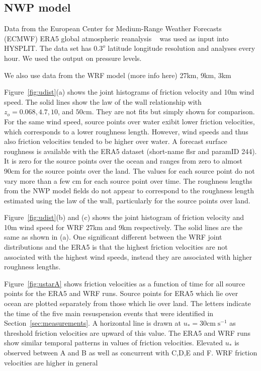
\subsection{NWP model}
Data from the European Center for Medium-Range Weather Forecasts (ECMWF) ERA5 global atmospheric reanalysis ~\citep{era5} was used
as input into HYSPLIT.
The data set has $0.3^o$ latitude longitude resolution and analyses every hour. We used the output on pressure levels.

We also use data from the WRF model (more info here) 27km, 9km, 3km


Figure~\ref{fig:udist}(a) shows the joint histograms of friction velocity and 10m wind speed. 
The solid lines show the law of the wall relationship with $z_o=0.068, 4.7, 10$, and $50 \mathrm{cm}$.  
They are not fits but simply shown for comparison. For the same wind speed, source points over water exibit lower
friction velocities, which corresponds to a lower roughness length. However, wind speeds and thus also friction velocities
tended to be higher over water.  
A forecast surface roughness is available with the ERA5 dataset (short-name flsr and paramID 244). 
It is zero for the source points over the ocean and ranges from zero to almost 90cm for
the source points over the land. The values for each source point do not vary more than a few cm for each source point over time.
The roughness lengths from the NWP model fields do not appear to correspond to the roughness length estimated using the law of the wall, particularly for the source points over land.

Figure~\ref{fig:udist}(b) and (c) shows the joint histogram of friction velocity and 10m wind speed for WRF 27km and 9km respectively. 
The solid lines are the same as shown in (a). 
One significant different between the WRF joint distributions and the ERA5 is that the highest friction velocities are
not associated with the highest wind speeds, instead they are associated with higher roughness lengths. 

Figure~\ref{fig:ustarA} shows friction velocities as a function of time for all source points for the ERA5 and WRF runs. 
Source points for ERA5 which lie over ocean are plotted separately from those which lie over land.
The letters indicate the time of
the five main resuspension events that were identified in Section~\ref{sec:measurements}.
A horizontal line is drawn at $u_*=30\mathrm{cm}\;\mathrm{s}^{-1}$ as threshold friction velocities are upward of this value.
The ERA5 and WRF runs show similar temporal patterns in values of friction velocities. Elevated $u_*$ is observed between A and B as well
as concurrent with C,D,E and F. WRF friction velocities are higher in general





